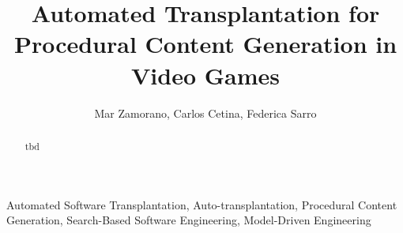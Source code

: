 \documentclass[lettersize,journal]{IEEEtran}
\title{Automated Transplantation for Procedural Content Generation in Video Games}
\author{Mar Zamorano, Carlos Cetina, Federica Sarro}
\begin{document}
\maketitle

\begin{abstract}
tbd
\end{abstract}

\begin{IEEEkeywords}
Automated Software Transplantation, Auto-transplantation, Procedural Content Generation, Search-Based Software Engineering, Model-Driven Engineering
\end{IEEEkeywords}














\end{document}
